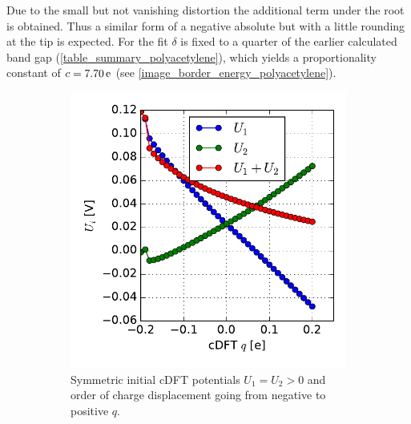 Due to the small but not vanishing distortion the additional term under the root is obtained. Thus a similar form of a negative absolute but with a little rounding at the tip is expected. For the fit $\delta$ is fixed to a quarter of the earlier calculated band gap (\cref{table_summary_polyacetylene}), which yields a proportionality constant of $c = \unit[7.70]{e}$ (see \cref{image_border_energy_polyacetylene}).\\
\begin{figure}
	\centering
	\begin{subfigure}{0.45\textwidth}
	\centering
	\includegraphics[width = \textwidth]{Images/polyacetylene/charging/potential_q_asymmetric}
	\caption{Symmetric initial cDFT potentials $U_1 = U_2 > 0$ and order of charge displacement going from negative to  positive $q$.}
	\label{}
	\end{subfigure}\hspace*{.5cm}
	\begin{subfigure}{0.45\textwidth}
	\centering

\end{subfigure}
\end{figure}
